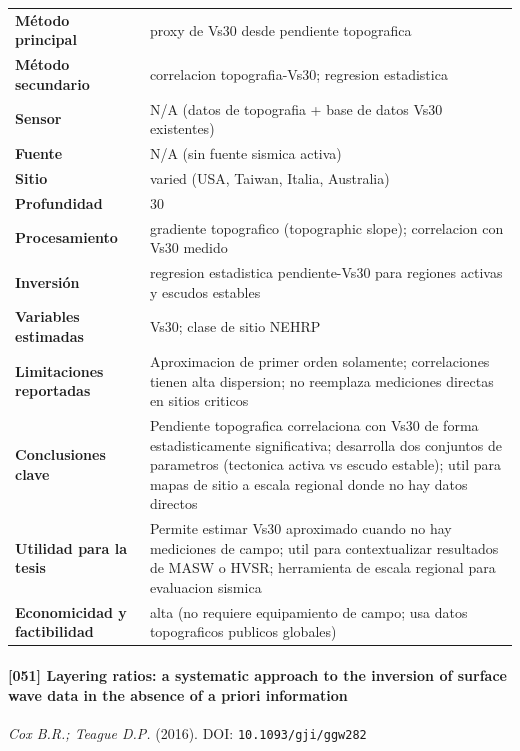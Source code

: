 \begin{center}\scriptsize
\begin{tabularx}{\textwidth}{@{}>{\bfseries}p{3.3cm} X@{}}
\toprule
M\'etodo principal & proxy de Vs30 desde pendiente topografica \\
M\'etodo secundario & correlacion topografia-Vs30; regresion estadistica \\
Sensor & N/A (datos de topografia + base de datos Vs30 existentes) \\
Fuente & N/A (sin fuente sismica activa) \\
Sitio & varied (USA, Taiwan, Italia, Australia) \\
Profundidad & 30 \\
Procesamiento & gradiente topografico (topographic slope); correlacion con Vs30 medido \\
Inversi\'on & regresion estadistica pendiente-Vs30 para regiones activas y escudos estables \\
Variables estimadas & Vs30; clase de sitio NEHRP \\
Limitaciones reportadas & Aproximacion de primer orden solamente; correlaciones tienen alta dispersion; no reemplaza mediciones directas en sitios criticos \\
Conclusiones clave & Pendiente topografica correlaciona con Vs30 de forma estadisticamente significativa; desarrolla dos conjuntos de parametros (tectonica activa vs escudo estable); util para mapas de sitio a escala regional donde no hay datos directos \\
Utilidad para la tesis & Permite estimar Vs30 aproximado cuando no hay mediciones de campo; util para contextualizar resultados de MASW o HVSR; herramienta de escala regional para evaluacion sismica \\
Economicidad y factibilidad & alta (no requiere equipamiento de campo; usa datos topograficos publicos globales) \\
\bottomrule
\end{tabularx}
\end{center}

\paragraph{[051] Layering ratios: a systematic approach to the inversion of surface wave data in the absence of a priori information} \emph{Cox B.R.; Teague D.P.} (2016).
{\scriptsize DOI: \texttt{10.1093/gji/ggw282}}

